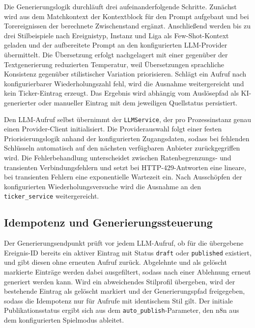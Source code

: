 Die Generierungslogik durchläuft drei aufeinanderfolgende Schritte. Zunächst wird aus dem Matchkontext der Kontextblock für den Prompt aufgebaut und bei Torereignissen der berechnete Zwischenstand ergänzt. Anschließend werden bis zu drei Stilbeispiele nach Ereignistyp, Instanz und Liga als Few-Shot-Kontext geladen und der aufbereitete Prompt an den konfigurierten LLM-Provider übermittelt. Die Übersetzung erfolgt nachgelagert mit einer gegenüber der Textgenerierung reduzierten Temperatur, weil Übersetzungen sprachliche Konsistenz gegenüber stilistischer Variation priorisieren. Schlägt ein Aufruf nach konfigurierbarer Wiederholungszahl fehl, wird die Ausnahme weitergereicht und kein Ticker-Eintrag erzeugt. Das Ergebnis wird abhängig vom Auslösepfad als KI-generierter oder manueller Eintrag mit dem jeweiligen Quellstatus persistiert.

Den LLM-Aufruf selbst übernimmt der \texttt{LLMService}, der pro Prozessinstanz genau einen Provider-Client initialisiert. Die Providerauswahl folgt einer festen Priorisierungslogik anhand der konfigurierten Zugangsdaten, sodass bei fehlenden Schlüsseln automatisch auf den nächsten verfügbaren Anbieter zurückgegriffen wird. Die Fehlerbehandlung unterscheidet zwischen Ratenbegrenzungs- und transienten Verbindungsfehlern und setzt bei HTTP-429-Antworten eine lineare, bei transienten Fehlern eine exponentielle Wartezeit ein. Nach Ausschöpfen der konfigurierten Wiederholungsversuche wird die Ausnahme an den \texttt{ticker\_service} weitergereicht.

\subsection{Idempotenz und Generierungssteuerung}\label{idempotenz-und-generierungssteuerung}

Der Generierungsendpunkt prüft vor jedem LLM-Aufruf, ob für die übergebene Ereignis-ID bereits ein aktiver Eintrag mit Status \texttt{draft} oder \texttt{published} existiert, und gibt diesen ohne erneuten Aufruf zurück. Abgelehnte und als gelöscht markierte Einträge werden dabei ausgefiltert, sodass nach einer Ablehnung erneut generiert werden kann. Wird ein abweichendes Stilprofil übergeben, wird der bestehende Eintrag als gelöscht markiert und der Generierungspfad freigegeben, sodass die Idempotenz nur für Aufrufe mit identischem Stil gilt. Der initiale Publikationsstatus ergibt sich aus dem \texttt{auto\_publish}-Parameter, den n8n aus dem konfigurierten Spielmodus ableitet.

